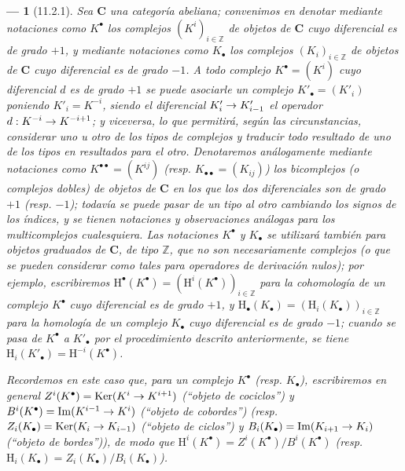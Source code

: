 \documentclass[10pt,oneside,openany]{book}
\theoremstyle{egaenv}\newtheorem*{env}{---}
\theoremstyle{egastatement}
\theoremstyle{egadescription}
\renewcommand{\to}{\mathchoice{\longrightarrow}{\rightarrow}{\rightarrow}{\rightarrow}}
\begin{document}
\begin{env}[11.2.1]
\label{0.11.2.1}
\label{0.11.2.1-fr}
Sea $\boldsymbol{C}$ una categoría abeliana; convenimos en denotar mediante notaciones como $K^\bullet$ los \emph{complejos $(K^i)_{i\in\mathbb Z}$} de objetos de $\boldsymbol{C}$ cuyo diferencial es de grado $+1$, y mediante notaciones como $K_\bullet$ los complejos $(K_i)_{i\in\mathbb Z}$ de objetos de $\boldsymbol{C}$ cuyo diferencial es de grado $-1$.
A todo complejo $K^\bullet=(K^i)$ cuyo diferencial $d$ es de grado $+1$ se puede asociarle un complejo $K'_\bullet=(K'_i)$ poniendo $K'_i=K^{-i}$, siendo el diferencial $K'_i\to K'_{i-1}$ el operador $d:K^{-i}\to K^{-i+1}$; y \emph{viceversa}, lo que permitirá, según las circunstancias, considerar uno u otro de los tipos de complejos y traducir todo resultado de uno de los tipos en resultados para el otro.
Denotaremos análogamente mediante notaciones como $K^{\bullet\bullet}=(K^{ij})$ (resp. $K_{\bullet\bullet}=(K_{ij})$) los \emph{bicomplejos} (o \emph{complejos dobles}) de objetos de $\boldsymbol{C}$ en los que los \emph{dos} diferenciales son de grado $+1$ (resp. $-1$); todavía se puede pasar de un tipo al otro cambiando los signos de los índices, y se tienen notaciones y observaciones análogas para los multicomplejos cualesquiera.
Las notaciones $K^\bullet$ y $K_\bullet$ se utilizará también para \emph{objetos graduados} de $\boldsymbol{C}$, de tipo $\mathbb Z$, que no son necesariamente complejos (o que se pueden considerar como tales para operadores de derivación \emph{nulos}); por ejemplo, escribiremos
$\mathrm H^\bullet(K^\bullet)=(\mathrm H^i(K^\bullet))_{i\in\mathbb Z}$ para la \emph{cohomología} de un complejo $K^\bullet$ cuyo diferencial es de grado $+1$, y $\mathrm H_\bullet(K_\bullet)=(\mathrm H_i(K_\bullet))_{i\in\mathbb Z}$ para la \emph{homología} de un complejo $K_\bullet$ cuyo diferencial es de grado $-1$; cuando se pasa de $K^\bullet$ a $K'_\bullet$ por el procedimiento descrito anteriormente, se tiene $\mathrm H_i(K'_\bullet)=\mathrm H^{-i}(K^\bullet)$.

Recordemos en este caso que, para un complejo $K^\bullet$ (resp. $K_\bullet$), escribiremos en general $Z^i(K^\bullet)=\operatorname{Ker}(K^i\to K^{i+1})$ (``objeto de cociclos'') y $B^i(K^\bullet)=\operatorname{Im}(K^{i-1}\to K^i)$ (``objeto de cobordes'') (resp. $Z_i(K_\bullet)=\operatorname{Ker}(K_i\to K_{i-1})$ (``objeto de ciclos'') y $B_i(K_\bullet)=\operatorname{Im}(K_{i+1}\to K_i)$ (``objeto de bordes'')), de modo que $\mathrm H^i(K^\bullet)=Z^i(K^\bullet)/B^i(K^\bullet)$ (resp. $\mathrm H_i(K_\bullet)=Z_i(K_\bullet)/B_i(K_\bullet)$).


\end{env}
\end{document}
